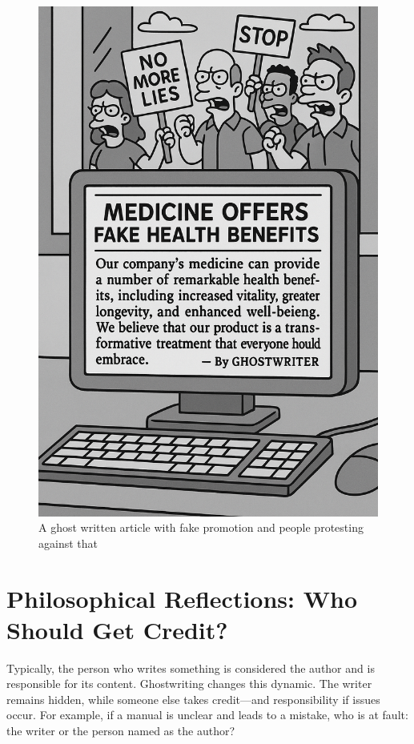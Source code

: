 \documentclass[a4paper,10pt,twocolumn]{memoir}
\begin{document}
\begin{figure}[ht]
  \centering
  \includegraphics[width=\columnwidth]{gw2.png}
  \caption*{A ghost written article with fake promotion and people protesting against that}
  \label{gw2}
\end{figure}


\section*{Philosophical Reflections: Who Should Get Credit?}
Typically, the person who writes something is considered the author and is responsible for its content. Ghostwriting changes this dynamic. The writer remains hidden, while someone else takes credit—and responsibility if issues occur. For example, if a manual is unclear and leads to a mistake, who is at fault: the writer or the person named as the author?
\end{document}
